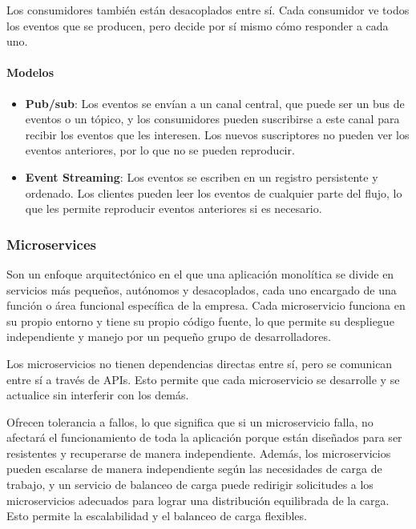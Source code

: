 \documentclass{article}
\begin{document}
		Los consumidores también están desacoplados entre sí. Cada consumidor ve todos los eventos que se producen, pero decide por sí mismo cómo responder a cada uno.
		
		\paragraph{Modelos}
		\begin{itemize}
			\item {\textbf{Pub/sub}}: Los eventos se envían a un canal central, que puede ser un bus de eventos o un tópico, y los consumidores pueden suscribirse a este canal para recibir los eventos que les interesen. Los nuevos suscriptores no pueden ver los eventos anteriores, por lo que no se pueden reproducir. 
			\item {\textbf{Event Streaming}}: Los eventos se escriben en un registro persistente y ordenado. Los clientes pueden leer los eventos de cualquier parte del flujo, lo que les permite reproducir eventos anteriores si es necesario.
		\end{itemize}
		
		
		\subsubsection{Microservices}
		Son un enfoque arquitectónico en el que una aplicación monolítica se divide en servicios más pequeños, autónomos y desacoplados, cada uno encargado de una función o área funcional específica de la empresa. Cada microservicio funciona en su propio entorno y tiene su propio código fuente, lo que permite su despliegue independiente y manejo por un pequeño grupo de desarrolladores.
		
		Los microservicios no tienen dependencias directas entre sí, pero se comunican entre sí a través de APIs. Esto permite que cada microservicio se desarrolle y se actualice sin interferir con los demás.
		
		Ofrecen tolerancia a fallos, lo que significa que si un microservicio falla, no afectará el funcionamiento de toda la aplicación porque están diseñados para ser resistentes y recuperarse de manera independiente. Además, los microservicios pueden escalarse de manera independiente según las necesidades de carga de trabajo, y un servicio de balanceo de carga puede redirigir solicitudes a los microservicios adecuados para lograr una distribución equilibrada de la carga. Esto permite la escalabilidad y el balanceo de carga flexibles. 
		
\end{document}
